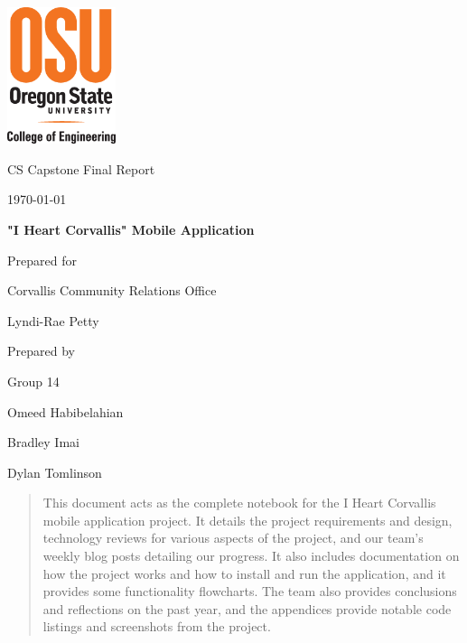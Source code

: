 \documentclass[onecolumn, draftclsnofoot,10pt, compsoc]{IEEEtran}
\def \CapstoneTeamName{		The Cleverly Named Team}
\def \CapstoneTeamNumber{		14}
\def \GroupMemberOne{			Omeed Habibelahian}
\def \GroupMemberTwo{			Bradley Imai}
\def \GroupMemberThree{			Dylan Tomlinson}
\def \CapstoneProjectName{		"I Heart Corvallis" Mobile Application}
\def \CapstoneSponsorCompany{	Corvallis Community Relations Office}
\def \CapstoneSponsorPerson{		Lyndi-Rae Petty}
\def \DocType{		%
        Final Report
				}
\newcommand{\NameSigPair}[1]{\par
\makebox[2.75in][r]{#1} \hfil 	\makebox[3.25in]{\makebox[2.25in]{\hrulefill} \hfill		\makebox[.75in]{\hrulefill}}
\par\vspace{-12pt} \textit{\tiny\noindent
\makebox[2.75in]{} \hfil		\makebox[3.25in]{\makebox[2.25in][r]{Signature} \hfill	\makebox[.75in][r]{Date}}}}
\renewcommand{\NameSigPair}[1]{#1}
\begin{document}
\begin{titlepage}
    \begin{singlespace}
    	\includegraphics[height=4cm]{coe_v_spot1}
        \hfill
        \par\vspace{.2in}
        \centering
        \scshape{
            \huge CS Capstone \DocType \par
            {\large\today}\par
            \vspace{.5in}
            \textbf{\Huge\CapstoneProjectName}\par
            \vfill
            {\large Prepared for}\par
            \Huge \CapstoneSponsorCompany\par
            \vspace{5pt}
            {\Large\NameSigPair{\CapstoneSponsorPerson}\par}
            {\large Prepared by }\par
            Group\CapstoneTeamNumber\par
            \vspace{5pt}
            {\Large
                \NameSigPair{\GroupMemberOne}\par
                \NameSigPair{\GroupMemberTwo}\par
                \NameSigPair{\GroupMemberThree}\par
            }
            \vspace{20pt}
        }
        \begin{abstract}
        		This document acts as the complete notebook for the I Heart Corvallis mobile application project. It details the project requirements and design, technology reviews for various aspects of the project, and our team's weekly blog posts detailing our progress. It also includes documentation on how the project works and how to install and run the application, and it provides some functionality flowcharts. The team also provides conclusions and reflections on the past year, and the appendices provide notable code listings and screenshots from the project.
        \end{abstract}
    \end{singlespace}
\end{titlepage}
\newpage
{}
\tableofcontents
\clearpage
\end{document}
